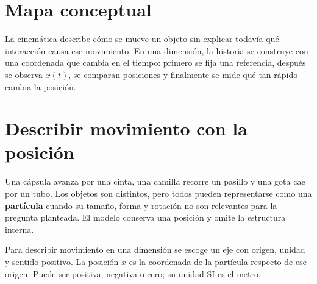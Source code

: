 \documentclass[11pt]{article}
\begin{document}

\tableofcontents
\inicioContenido

\section{Mapa conceptual}


La cinemática describe cómo se mueve un objeto sin explicar todavía qué
interacción causa ese movimiento. En una dimensión, la historia se construye
con una coordenada que cambia en el tiempo: primero se fija una referencia,
después se observa \(x(t)\), se comparan posiciones y finalmente se mide qué
tan rápido cambia la posición.

\section{Describir movimiento con la posición}

Una cápsula avanza por una cinta, una camilla recorre un pasillo y una gota cae
por un tubo. Los objetos son distintos, pero todos pueden representarse como
una \textbf{partícula} cuando su tamaño, forma y rotación no son relevantes
para la pregunta planteada. El modelo conserva una posición y omite la
estructura interna.

Para describir movimiento en una dimensión se escoge un eje con origen, unidad
y sentido positivo. La posición \(x\) es la coordenada de la partícula respecto
de ese origen. Puede ser positiva, negativa o cero; su unidad SI es el metro.
\end{document}

